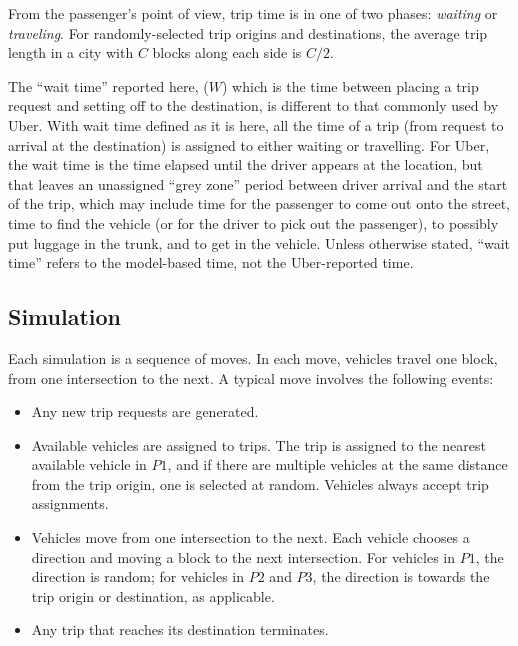 \documentclass[
  letterpaper,
]{article}
\begin{document}
From the passenger's point of view, trip time is in one of two phases:
\emph{waiting} or \emph{traveling}. For randomly-selected trip origins
and destinations, the average trip length in a city with \(C\) blocks
along each side is \(C/2\).

The ``wait time'' reported here, (\(W\)) which is the time between
placing a trip request and setting off to the destination, is different
to that commonly used by Uber. With wait time defined as it is here, all
the time of a trip (from request to arrival at the destination) is
assigned to either waiting or travelling. For Uber, the wait time is the
time elapsed until the driver appears at the location, but that leaves
an unassigned ``grey zone'' period between driver arrival and the start
of the trip, which may include time for the passenger to come out onto
the street, time to find the vehicle (or for the driver to pick out the
passenger), to possibly put luggage in the trunk, and to get in the
vehicle. Unless otherwise stated, ``wait time'' refers to the
model-based time, not the Uber-reported time.

\hypertarget{the-simulation}{%
\subsection{Simulation}\label{the-simulation}}

Each simulation is a sequence of moves. In each move, vehicles travel
one block, from one intersection to the next. A typical move involves
the following events:

\begin{itemize}
\item
  Any new trip requests are generated.
\item
  Available vehicles are assigned to trips. The trip is assigned to the
  nearest available vehicle in \(P1\), and if there are multiple
  vehicles at the same distance from the trip origin, one is selected at
  random. Vehicles always accept trip assignments.
\item
  Vehicles move from one intersection to the next. Each vehicle chooses
  a direction and moving a block to the next intersection. For vehicles
  in \(P1\), the direction is random; for vehicles in \(P2\) and \(P3\),
  the direction is towards the trip origin or destination, as
  applicable.
\item
  Any trip that reaches its destination terminates.
\end{itemize}
\end{document}
